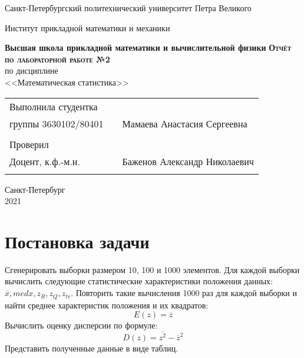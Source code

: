 \documentclass[a4paper]{article}
\begin{document}
\begin{titlepage}
  \begin{center}
    \large
    Санкт-Петербургский политехнический университет Петра Великого
    
    Институт прикладной математики и механики
    
    \textbf{Высшая школа прикладной математики и вычислительной физики}
    \vfill
    \textsc{\textbf{\large{Отчёт по лабораторной работе №2}}}\\[5mm]
     по дисциплине\\ <<Математическая статистика>>\\
\end{center}

\vfill

\begin{tabular}{l p{} l}
Выполнила студентка \\группы 3630102/80401 && Мамаева Анастасия Сергеевна \\
\\
Проверил\\Доцент, к.ф.-м.н.& \hspace{0pt} &   Баженов Александр Николаевич \\\\
\end{tabular}

\hfill \break
\hfill \break
\begin{center} Санкт-Петербург \\2021 \end{center}
\thispagestyle{empty}
\end{titlepage}
\newpage
\newpage
\begin{center}
    \setcounter{page}{2}
    \tableofcontents
\end{center}
\newpage
\begin{center}
    \setcounter{page}{3}
    \listoftables
\end{center}

\newpage
\section {Постановка задачи}
\noindent Сгенерировать выборки размером 10, 100 и 1000 элементов.
Для каждой выборки вычислить следующие статистические характеристики положения данных: $\overline{x}, med x, z_R, z_Q, z_{tr}.$ Повторить такие вычисления 1000 раз для каждой выборки и найти среднее характеристик положения и их квадратов:
\begin{equation}
	E(z) = \overline{z}
\end{equation}
Вычислить оценку дисперсии по формуле:
\begin{equation}
	D(z) = \overline{z^2} - \overline{z}^2
\end{equation}
Представить полученные данные в виде таблиц.
\end{document}
